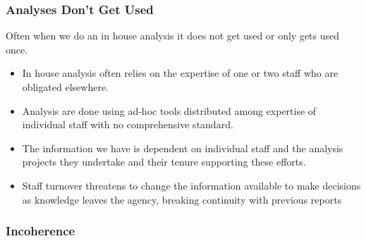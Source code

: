 \documentclass[12pt,handout]{beamer}
\begin{document}
{
\begin{frame}[plain]
\end{frame}
}

\begin{frame}
\frametitle{Analyses Don't Get Used}
Often when we do an in house analysis it does not get used or only gets used once.
  \begin{itemize}
  \item In house analysis often relies on the expertise of one or two staff who are obligated elsewhere. 
  \pause
  \item Analysis are done using ad-hoc tools distributed among expertise of individual staff with no comprehensive standard. 
  \pause
  \item The information we have is dependent on individual staff and the analysis projects they undertake and their tenure supporting these efforts.
  \pause
  \item Staff turnover threatens to change the information available to make decisions as knowledge leaves the agency, breaking continuity with previous reports
  \pause
  \end{itemize}
\end{frame}

{
\begin{frame}[plain]
\frametitle{Incoherence}
\end{frame}
}
\end{document}
